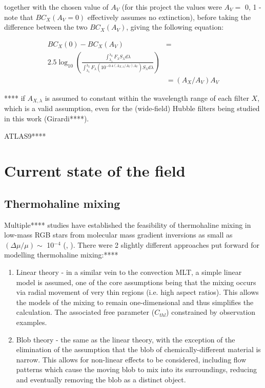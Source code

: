 \documentclass[12pt, a4paper]{report}
\begin{document}
together with the chosen value of $A_{V}$ (for this project the values were $A_{V} =$ 0, 1 - note that $BC_{X}(A_{V}=0)$  effectively assumes no extinction), before taking the difference between the two $BC_{X}(A_{V})$, giving the following equation:

\begin{align}
BC_{X}(0) - BC_{X}(A_{V}) &= \\ 2.5 \log_{10} \left( \frac{\int_{\lambda_{1}}^{\lambda_{2}} F_{\lambda}  S_{\lambda} d\lambda}{\int_{\lambda_{1}}^{\lambda_{2}} F_{\lambda}\left( 10^{-0.4 \left(A_{X,\lambda}/A_{V}\right)A_{V}} \right) S_{\lambda} d\lambda} \right)
\\ &= \left(A_{X}/A_{V}\right)A_{V}
\label{BCs_diff}
\end{align}

**** if $A_{X,\lambda}$ is assumed to constant within the wavelength range of each filter $X$, which is a valid assumption, even for the (wide-field) Hubble filters being studied in this work (Girardi****).

ATLAS9****

\chapter{Current state of the field}
\section{Thermohaline mixing}
Multiple**** studies have established the feasibility of thermohaline mixing in low-mass RGB stars from molecular mass gradient inversions as small as $(\Delta\mu / \mu) \sim$ 10$^{-4}$ (\cite{2006Sci...314.1580E}, \cite{2010ApJ...723..563D}). There were 2 slightly different approaches put forward for modelling thermohaline mixing:****
\begin{enumerate}

\item Linear theory \citep{1972ApJ...172..165U} - in a similar vein to the convection MLT, a simple linear model is assumed, one of the core assumptions being that the mixing occurs via radial movement of very thin regions (i.e. high aspect ratios). This allows the models of the mixing to remain one-dimensional and thus simplifies the calculation. The associated free parameter ($C_{thl}$) constrained by observation examples.
\item Blob theory \citep{1980A&A....91..175K} - the same as the linear theory, with the exception of the elimination of the assumption that the blob of chemically-different material is narrow. This allows for non-linear effects to be considered, including flow patterns which cause the moving blob to mix into its surroundings, reducing and eventually removing the blob as a distinct object.
\end{enumerate}
\end{document}
